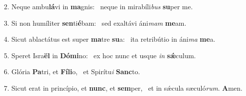 2. Neque ambu\textbf{lá}vi in \textbf{ma}gnis: \ast\  neque in mirabíli\textit{bus} \textbf{su}per me.\

3. Si non humíliter \textbf{sen}ti\textbf{é}bam: \ast\  sed exaltávi áni\textit{mam} \textbf{me}am.\

4. Sicut ablactátus est super \textbf{ma}tre \textbf{su}a: \ast\  ita retribútio in áni\textit{ma} \textbf{me}a.\

5. Speret Isra\textbf{ël} in \textbf{Dó}\textbf{mi}no: \ast\  ex hoc nunc et usque \textit{in} \textbf{sǽ}culum.\

6. Glória \textbf{Pa}tri, et \textbf{Fí}\textbf{li}o, \ast\  et Spirítu\textit{i} \textbf{Sanc}to.\

7. Sicut erat in princípio, et \textbf{nunc}, et \textbf{sem}per, \ast\  et in sǽcula sæculó\textit{rum}. \textbf{A}men.\

